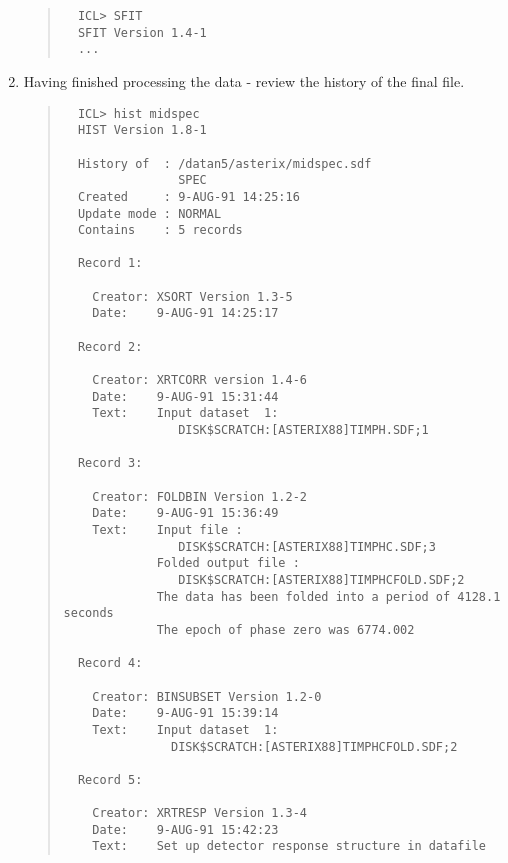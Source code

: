 \documentclass{book}
\renewcommand{\_}{{\tt\char'137}}     %
\begin{document}
\begin{enumerate}
\begin{quote}
\begin{verbatim}
  ICL> SFIT
  SFIT Version 1.4-1
  ...
  \end{verbatim}\end{quote}
\item Having finished processing the data - review the history
of the final file.

\begin{quote}\begin{verbatim}
  ICL> hist midspec
  HIST Version 1.8-1

  History of  : /datan5/asterix/midspec.sdf
                SPEC
  Created     : 9-AUG-91 14:25:16
  Update mode : NORMAL
  Contains    : 5 records

  Record 1:

    Creator: XSORT Version 1.3-5
    Date:    9-AUG-91 14:25:17

  Record 2:

    Creator: XRTCORR version 1.4-6
    Date:    9-AUG-91 15:31:44
    Text:    Input dataset  1:
                DISK$SCRATCH:[ASTERIX88]TIMPH.SDF;1

  Record 3:

    Creator: FOLDBIN Version 1.2-2
    Date:    9-AUG-91 15:36:49
    Text:    Input file :
                DISK$SCRATCH:[ASTERIX88]TIMPHC.SDF;3
             Folded output file :
                DISK$SCRATCH:[ASTERIX88]TIMPHCFOLD.SDF;2
             The data has been folded into a period of 4128.1 seconds
             The epoch of phase zero was 6774.002

  Record 4:

    Creator: BINSUBSET Version 1.2-0
    Date:    9-AUG-91 15:39:14
    Text:    Input dataset  1:
               DISK$SCRATCH:[ASTERIX88]TIMPHCFOLD.SDF;2

  Record 5:

    Creator: XRTRESP Version 1.3-4
    Date:    9-AUG-91 15:42:23
    Text:    Set up detector response structure in datafile
  \end{verbatim}\end{quote}
\end{enumerate}
\end{document}
